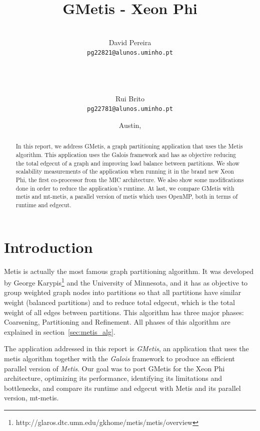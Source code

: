 \documentclass[abstract=on,9pt,twocolumn]{scrartcl}
\title{GMetis - Xeon Phi}
\author{
    \\David Pereira\\
     	\texttt{\smaller pg22821@alunos.uminho.pt}
\\~\\~
\and\\Rui Brito\\
	\texttt{\smaller pg22781@alunos.uminho.pt}
}
\date{Austin, \docdate}
\begin{document}
\maketitle	



\begin{abstract}
In this report, we address GMetis, a graph partitioning application that
uses the Metis algorithm. This application uses the Galois framework
and has as objective reducing the total edgecut of a graph and improving
load balance between partitions. We show scalability measurements of the
application when running it in the brand new Xeon Phi, the first
co-processor from the MIC architecture. We also show some modifications
done in order to reduce the application's runtime. At last, we compare
GMetis with metis and mt-metis, a parallel version of metis which uses
OpenMP, both in terms of runtime and edgecut.
\end{abstract}



\section{Introduction}
Metis is actually the most famous graph partitioning algorithm. It was
developed by George
Karypis\footnote{http://glaros.dtc.umn.edu/gkhome/metis/metis/overview}
and the University of Minnesota, and it has as objective to group
weighted graph nodes into partitions so that all partitions have similar
weight (balanced partitions) and to reduce total edgecut, which is the
total weight of all edges between partitions. This algorithm has three
major phases: Coarsening, Partitioning and Refinement.
All phases of this algorithm are explained in
section~\ref{sec:metis_alg}.

The application addressed in this report is \textit{GMetis}, an
application that uses the metis algorithm together with the
\textit{Galois} framework to produce an efficient parallel version of
\textit{Metis}. Our goal was to port GMetis for the Xeon Phi
architecture, optimizing its performance, identifying its
limitations and bottlenecks, and compare its runtime and edgecut with
Metis and its parallel version, mt-metis.
\end{document}
